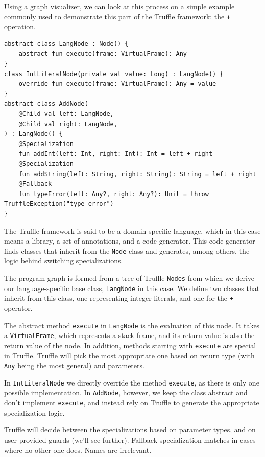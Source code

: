 \documentclass[english,zadani,odsaz]{fitthesis}
\begin{document}
Using a graph visualizer, we can look at this process on a simple example
commonly used to demonstrate this part of the Truffle framework: the \texttt{+}
operation.

\begin{verbatim}
abstract class LangNode : Node() {
    abstract fun execute(frame: VirtualFrame): Any
}
class IntLiteralNode(private val value: Long) : LangNode() {
    override fun execute(frame: VirtualFrame): Any = value
}
abstract class AddNode(
    @Child val left: LangNode,
    @Child val right: LangNode,
) : LangNode() {
    @Specialization
    fun addInt(left: Int, right: Int): Int = left + right
    @Specialization
    fun addString(left: String, right: String): String = left + right
    @Fallback
    fun typeError(left: Any?, right: Any?): Unit = throw TruffleException("type error")
}
\end{verbatim}

The Truffle framework is said to be a domain-specific language, which in this
case means a library, a set of annotations, and a code generator. This code
generator finds classes that inherit from the \texttt{Node} class and generates, among
others, the logic behind switching specializations.

The program graph is formed from a tree of Truffle \texttt{Nodes} from which we derive
our language-specific base class, \texttt{LangNode} in this case. We define two classes
that inherit from this class, one representing integer literals, and one for the \texttt{+}
operator.

The abstract method \texttt{execute} in \texttt{LangNode} is the evaluation of this node. It takes
a \texttt{VirtualFrame}, which represents a stack frame, and its return value is also the
return value of the node. In addition, methods starting with \texttt{execute} are special
in Truffle. Truffle will pick the most appropriate one based on return type
(with \texttt{Any} being the most general) and parameters.

In \texttt{IntLiteralNode} we directly override the method \texttt{execute}, as there is only one
possible implementation. In \texttt{AddNode}, however, we keep the class abstract and
don't implement \texttt{execute}, and instead rely on Truffle to generate the appropriate
specialization logic.

Truffle will decide between the specializations based on parameter types, and on
user-provided guards (we'll see further). Fallback specialization matches in
cases where no other one does. Names are irrelevant.
\end{document}
